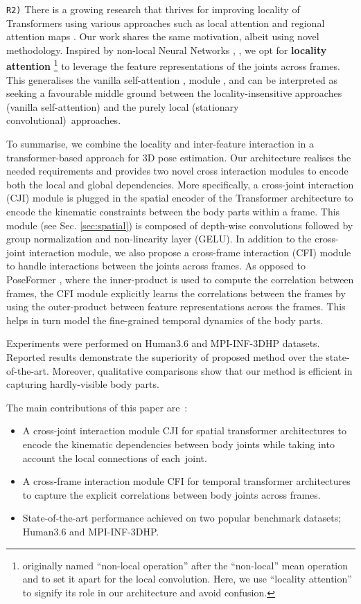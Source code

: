 \documentclass[runningheads]{llncs}
\begin{document}
\texttt{R2)} There is a growing research that thrives for improving locality of Transformers using various approaches such as local attention \cite{ding2021ap} and regional attention maps \cite{chen2021regionvit}. Our work shares the same motivation, albeit using novel methodology. Inspired by non-local Neural Networks \cite{wang2018non}, \cite{yue2018compact}, we opt for \textbf{locality attention} \footnote{originally named ``non-local operation'' \cite{wang2018non} after the ``non-local'' mean operation \cite{buades2005non} and to set it apart for the local convolution. Here, we use ``locality attention''  to signify its role in our architecture and avoid confusion.} to leverage the feature representations of the joints across frames. This generalises the vanilla self-attention \cite{wang2018non}, module \cite{vaswani2017attention}, and can be interpreted as seeking a favourable middle ground between the locality-insensitive approaches (vanilla self-attention) and the purely local (stationary convolutional)~approaches.

To summarise, we combine the locality and inter-feature interaction in a transformer-based approach for 3D pose estimation. 
Our architecture realises the needed requirements and provides two novel cross interaction modules to encode both the local and global dependencies. More specifically, a cross-joint interaction (CJI) module is plugged in the spatial encoder of the Transformer architecture to encode the kinematic constraints between the body parts within a frame. This module (see Sec. \ref{sec:spatial}) is composed of depth-wise convolutions followed by group normalization and non-linearity layer (GELU). In addition to the cross-joint interaction module, we also propose a cross-frame interaction (CFI) module to handle interactions between the joints across frames. As opposed to PoseFormer \cite{poseformer}, where the inner-product is used to compute the correlation between frames, the CFI module explicitly learns the correlations between the frames by using the outer-product between feature representations across the frames. This helps in turn model the fine-grained temporal dynamics of the body parts. 

Experiments were performed on Human3.6 \cite{human} and MPI-INF-3DHP \cite{3DHP} datasets. Reported results demonstrate the superiority of proposed method over the state-of-the-art. Moreover, qualitative comparisons show that our method is efficient in capturing hardly-visible body parts. 

The main contributions of this paper are~:
\begin{itemize}
\item A cross-joint interaction module CJI for spatial transformer architectures to encode the kinematic dependencies between body joints while taking into account the local connections of each~joint.
\item A cross-frame interaction module CFI for temporal transformer architectures to capture the explicit correlations between body joints across frames.
\item State-of-the-art performance achieved on two popular benchmark datasets; Human3.6 and MPI-INF-3DHP.
\end{itemize}
\end{document}
